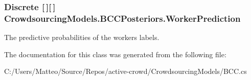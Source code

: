 \subsubsection[{Worker\+Prediction}]{\setlength{\rightskip}{0pt plus 5cm}Discrete \mbox{[}$\,$\mbox{]}\mbox{[}$\,$\mbox{]} Crowdsourcing\+Models.\+B\+C\+C\+Posteriors.\+Worker\+Prediction}\label{class_crowdsourcing_models_1_1_b_c_c_posteriors_a2bf09db28d0e9cdf9c6816c9e798ec95}


The predictive probabilities of the worker\textquotesingle{}s labels. 



The documentation for this class was generated from the following file\+:\begin{DoxyCompactItemize}
\item 
C\+:/\+Users/\+Matteo/\+Source/\+Repos/active-\/crowd/\+Crowdsourcing\+Models/B\+C\+C.\+cs\end{DoxyCompactItemize}
